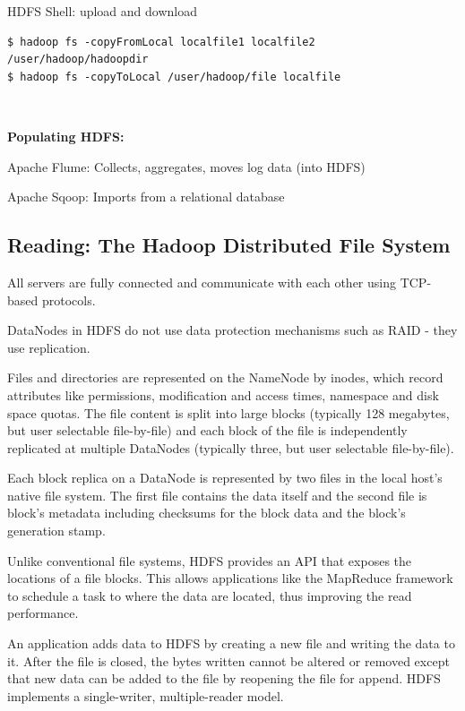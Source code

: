\documentclass[11pt,oneside,a4paper]{article}
\begin{document}
HDFS Shell: upload and download

\vspace{-\topsep}
\begin{verbatim}
$ hadoop fs -copyFromLocal localfile1 localfile2 /user/hadoop/hadoopdir
$ hadoop fs -copyToLocal /user/hadoop/file localfile
\end{verbatim}\\
\vspace{-\topsep}

\textbf{Populating HDFS:}
\begin{compactitem}
	\item Apache Flume: Collects, aggregates, moves log data (into HDFS)
	\item Apache Sqoop: Imports from a relational database\\
\end{compactitem}

\subsection{Reading: The Hadoop Distributed File System \cite{shvachko2010hadoop}}

\begin{compactitem}
	\item All servers are fully connected and communicate with each other using TCP-based protocols.
	\item DataNodes in HDFS do not use data protection mechanisms such as RAID - they use replication.
	\item Files and directories are represented on the NameNode by inodes, which record attributes like permissions, modification and access times, namespace and disk space quotas. The file content is split into large blocks (typically 128 megabytes, but user selectable file-by-file) and each block of the file is independently replicated at multiple DataNodes (typically three, but user selectable file-by-file).
	\item Each block replica on a DataNode is represented by two files in the local host’s native file system. The first file contains the data itself and the second file is block’s metadata including checksums for the block data and the block’s generation stamp.
	\item Unlike conventional file systems, HDFS provides an API that exposes the locations of a file blocks. This allows applications like the MapReduce framework to schedule a task to where the data are located, thus improving the read performance.
	\item An application adds data to HDFS by creating a new file and writing the data to it. After the file is closed, the bytes written cannot be altered or removed except that new data can be added to the file by reopening the file for append. HDFS implements a single-writer, multiple-reader model.
\end{compactitem}
\end{document}
